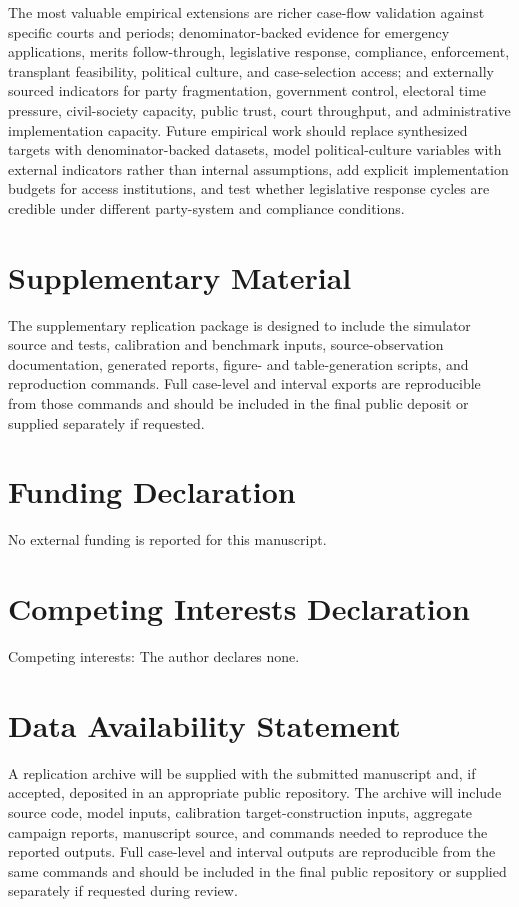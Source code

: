 \documentclass[
  journal=small,
  manuscript=research-article,
  year=2026
]{cup-journal}
\begin{document}
The most valuable empirical extensions are richer case-flow validation against specific courts and periods; denominator-backed evidence for emergency applications, merits follow-through, legislative response, compliance, enforcement, transplant feasibility, political culture, and case-selection access; and externally sourced indicators for party fragmentation, government control, electoral time pressure, civil-society capacity, public trust, court throughput, and administrative implementation capacity. Future empirical work should replace synthesized targets with denominator-backed datasets, model political-culture variables with external indicators rather than internal assumptions, add explicit implementation budgets for access institutions, and test whether legislative response cycles are credible under different party-system and compliance conditions.

\section*{Supplementary Material}
The supplementary replication package is designed to include the simulator source and tests, calibration and benchmark inputs, source-observation documentation, generated reports, figure- and table-generation scripts, and reproduction commands. Full case-level and interval exports are reproducible from those commands and should be included in the final public deposit or supplied separately if requested.

\section*{Funding Declaration}
No external funding is reported for this manuscript.

\section*{Competing Interests Declaration}
Competing interests: The author declares none.

\section*{Data Availability Statement}
A replication archive will be supplied with the submitted manuscript and, if accepted, deposited in an appropriate public repository. The archive will include source code, model inputs, calibration target-construction inputs, aggregate campaign reports, manuscript source, and commands needed to reproduce the reported outputs. Full case-level and interval outputs are reproducible from the same commands and should be included in the final public repository or supplied separately if requested during review.
\end{document}
